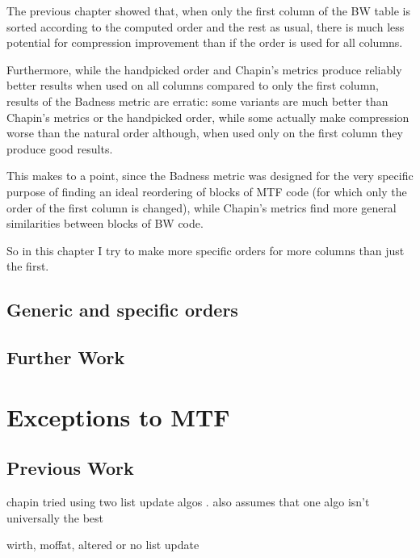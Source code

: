 \documentclass[a4paper]{scrreprt}
\begin{document}
The previous chapter showed that, when only the first column of the BW table is
sorted according to the computed order and the rest as usual, there is much less
potential for compression improvement than if the order is used for all columns.

Furthermore, while the handpicked order and Chapin's metrics produce reliably
better results when used on all columns compared to only the first column,
results of the Badness metric are erratic: some variants are much better than
Chapin's metrics or the handpicked order, while some actually make compression
worse than the natural order although, when used only on the first column they
produce good results.

This makes to a point, since the Badness metric was designed for the very
specific purpose of finding an ideal reordering of blocks of MTF code (for
which only the order of the first column is changed), while Chapin's metrics
find more general similarities between blocks of BW code.

So in this chapter I try to make more specific orders for more columns than just
the first.

\section{Generic and specific orders}

\section{Further Work}


\chapter{Exceptions to MTF}


\section{Previous Work}

chapin tried using two list update algos
\cite{chapin2000switching,chapin2001diss}. also assumes that one algo isn't
universally the best

wirth, moffat, altered or no list update \cite{wirth2001ranks}



\end{document}
